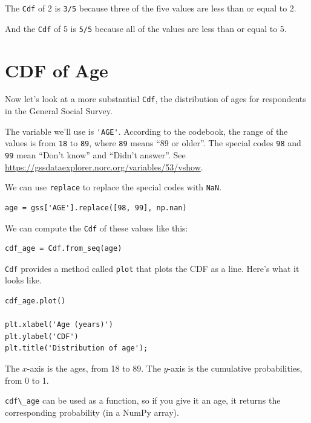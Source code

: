 The \passthrough{\lstinline!Cdf!} of 2 is \passthrough{\lstinline!3/5!}
because three of the five values are less than or equal to 2.

And the \passthrough{\lstinline!Cdf!} of 5 is
\passthrough{\lstinline!5/5!} because all of the values are less than or
equal to 5.

\hypertarget{cdf-of-age}{%
\section{CDF of Age}\label{cdf-of-age}}

Now let's look at a more substantial \passthrough{\lstinline!Cdf!}, the
distribution of ages for respondents in the General Social Survey.

The variable we'll use is \passthrough{\lstinline!'AGE'!}. According to
the codebook, the range of the values is from
\passthrough{\lstinline!18!} to \passthrough{\lstinline!89!}, where
\passthrough{\lstinline!89!} means ``89 or older''. The special codes
\passthrough{\lstinline!98!} and \passthrough{\lstinline!99!} mean
``Don't know'' and ``Didn't answer''. See
\url{https://gssdataexplorer.norc.org/variables/53/vshow}.

We can use \passthrough{\lstinline!replace!} to replace the special
codes with \passthrough{\lstinline!NaN!}.

\begin{lstlisting}[]
age = gss['AGE'].replace([98, 99], np.nan)
\end{lstlisting}

We can compute the \passthrough{\lstinline!Cdf!} of these values like
this:

\begin{lstlisting}[]
cdf_age = Cdf.from_seq(age)
\end{lstlisting}

\passthrough{\lstinline!Cdf!} provides a method called
\passthrough{\lstinline!plot!} that plots the CDF as a line. Here's what
it looks like.

\begin{lstlisting}[]
cdf_age.plot()

plt.xlabel('Age (years)')
plt.ylabel('CDF')
plt.title('Distribution of age');
\end{lstlisting}

The \(x\)-axis is the ages, from 18 to 89. The \(y\)-axis is the
cumulative probabilities, from 0 to 1.

\passthrough{\lstinline!cdf\_age!} can be used as a function, so if you
give it an age, it returns the corresponding probability (in a NumPy
array).

